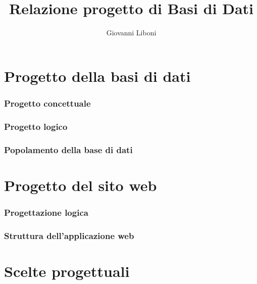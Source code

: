 \documentclass[a4paper,10pt]{report}
\title{Relazione progetto di Basi di Dati}
\author{Giovanni Liboni}
\begin{document}
\begin{frontespizio}



\end{frontespizio}

\tableofcontents

\newpage

\part{Progetto della basi di dati}

\section{Progetto concettuale}

\section{Progetto logico}

\section{Popolamento della base di dati}

\part{Progetto del sito web}

\section{Progettazione logica}

\section{Struttura dell'applicazione web}

\part{Scelte progettuali}
\end{document}
